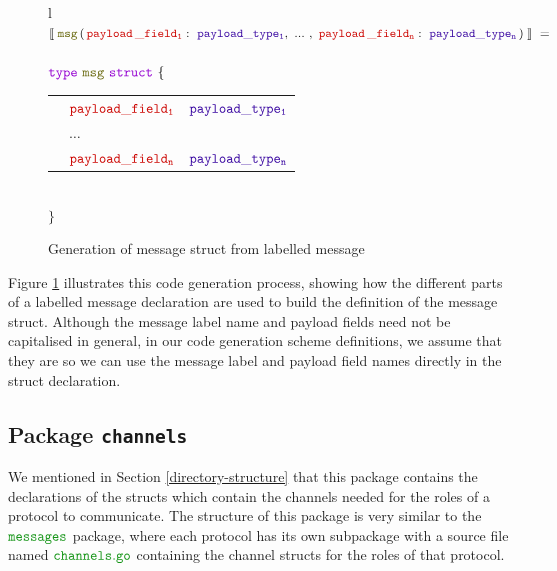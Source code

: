 \documentclass[12pt,twoside]{report}
\begin{document}
\begin{figure}[!h]
    \begin{center}
        \begin{tabular}{l}
            $\llbracket\;\structname{msg}\,(\,\payloaddecl{payload\,\_field}{payload\_type}{n}\,)\;\rrbracket\ = $\\\\
        
            $\gotype\ \structname{msg}\ \gostruct\ \{$\\[3pt]
            \begin{tabular}{lll}
                \indent & $\structfield{payload\_field_1}$ & $\typename{payload\_type_1}$\\
                \indent & $\dots$ &\\
                \indent & $\structfield{payload\_field_n}$ & $\typename{payload\_type_n}$
            \end{tabular}\\
        
            $\}$
        \end{tabular}
    \end{center}
    \caption{Generation of message struct from labelled message}
    \label{msg-struct-codegen}
\end{figure}

Figure \ref{msg-struct-codegen} illustrates this code generation process, showing how the different parts of a labelled message declaration are used to build the definition of the message struct. Although the message label name and payload fields need not be capitalised in general, in our code generation scheme definitions, we assume that they are so we can use the message label and payload field names directly in the struct declaration.\\

\subsection{Package \texttt{channels}}
We mentioned in Section \ref{directory-structure} that this package contains the declarations of the structs which contain the channels needed for the roles of a protocol to communicate. The structure of this package is very similar to the $\pkgname{messages}$ package, where each protocol has its own subpackage with a source file named $\filename{channels}$ containing the channel structs for the roles of that protocol.\\
\end{document}
